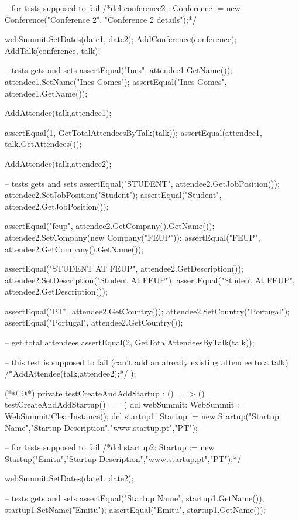 \begin{vdmpp}[breaklines=true]
  -- for tests supposed to fail
  /*dcl conference2 : Conference := new Conference("Conference 2", "Conference 2 details");*/
 
  webSummit.SetDates(date1, date2);
  AddConference(conference);
  AddTalk(conference, talk);
  
  -- tests gets and sets
  assertEqual("Ines", attendee1.GetName());
  attendee1.SetName("Ines Gomes");
  assertEqual("Ines Gomes", attendee1.GetName());
 
  AddAttendee(talk,attendee1);
  
  assertEqual(1, GetTotalAttendeesByTalk(talk));
  assertEqual({attendee1}, talk.GetAttendees());
  
  AddAttendee(talk,attendee2);
  
  -- tests gets and sets
  assertEqual("STUDENT", attendee2.GetJobPosition());
  attendee2.SetJobPosition("Student");
  assertEqual("Student", attendee2.GetJobPosition());
  
  assertEqual("feup", attendee2.GetCompany().GetName());
  attendee2.SetCompany(new Company("FEUP"));
  assertEqual("FEUP", attendee2.GetCompany().GetName());
  
  assertEqual("STUDENT AT FEUP", attendee2.GetDescription());
  attendee2.SetDescription("Student At FEUP");
  assertEqual("Student At FEUP", attendee2.GetDescription());
  
  assertEqual("PT", attendee2.GetCountry());
  attendee2.SetCountry("Portugal");
  assertEqual("Portugal", attendee2.GetCountry());
  
  -- get total attendees
  assertEqual(2, GetTotalAttendeesByTalk(talk));
  
  -- this test is supposed to fail (can't add an already existing attendee to a talk)
  /*AddAttendee(talk,attendee2);*/
 );

(*@
\label{testCreateAndAddStartup:387}
@*)
 private testCreateAndAddStartup : () ==> ()
 testCreateAndAddStartup() == (
  dcl webSummit: WebSummit := WebSummit`ClearInstance();
  dcl startup1: Startup := new Startup("Startup Name","Startup Description","www.startup.pt","PT");
  
  -- for tests supposed to fail
  /*dcl startup2: Startup := new Startup("Emitu","Startup Description","www.startup.pt","PT");*/
  
  webSummit.SetDates(date1, date2);
  
  -- tests gets and sets
  assertEqual("Startup Name", startup1.GetName());
  startup1.SetName("Emitu");
  assertEqual("Emitu", startup1.GetName());
  

\end{vdmpp}
